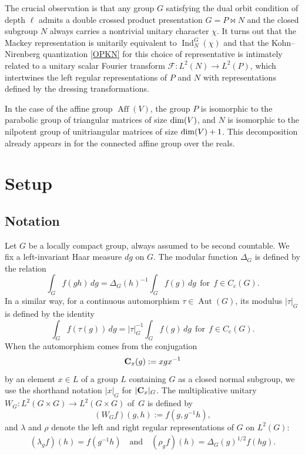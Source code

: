 \documentclass[a4paper,11pt,reqno]{amsart}
\numberwithin{equation}{section}
\theoremstyle{remark}
\theoremstyle{definition}
\newcommand\Aff{\operatorname{Aff}}
\newcommand\Aut{\operatorname{Aut}}
\newcommand{\CF}{\mathcal F}
\newcommand{\Ind}{\operatorname{Ind}}
\begin{document}
The crucial observation is that
any group $G$ satisfying the dual orbit condition of depth $\ell$ admits a double crossed product presentation $G=P\bowtie N$ and
 the closed subgroup $N$ always carries a nontrivial unitary character $\chi$. It turns out  that the Mackey representation is unitarily equivalent to
 ${\Ind}_{N}^G(\chi)$ and that the Kohn--Nirenberg quantization \eqref{OPKN} for this choice of representative is intimately related to a unitary
 scalar Fourier transform $\CF:L^2(N)\to L^2(P)$, which intertwines the left regular representations  of $P$ and $N$ with representations defined  by the dressing transformations.

In the case of the affine group $\Aff(V)$, the group $P$ is isomorphic to the parabolic group of  triangular matrices of size ${\rm dim}(V)$, and $N$
is isomorphic to the nilpotent group of  unitriangular matrices of size ${\rm dim}(V)+1$. This decomposition already appears in \cite{Medina}
for the connected affine group over the reals.


\section{Setup}

\subsection{Notation}
Let $G$ be a locally compact group, always assumed to be second countable. We fix a left-invariant Haar measure $dg$ on $G$.
The modular function $\Delta_G$ is defined by the relation
$$
\int_G f(gh)\,dg=\Delta_G(h)^{-1}\int_G f(g)\,dg\ \ \text{for}\ \ f\in C_c(G).
$$
In a similar way, for a continuous automorphism $\tau\in\Aut(G)$, its modulus $|\tau|_G$  is defined by the identity
$$
\int_Gf(\tau(g))\,dg=|\tau|_G^{-1}\int_Gf(g)\,dg\ \ \text{for}\ \ f\in C_c(G).
$$
When the automorphism comes from the conjugation $${\bf C}_x(g):=xgx^{-1}$$ by an element $x\in L$ of a group $L$
containing $G$ as a closed normal subgroup,  we use the shorthand notation $|x|_G$ for $|{\bf C}_x|_G$.
The multiplicative unitary $W_G\colon L^2(G\times G)\to L^2(G\times G)$ of~$G$ is defined by
$$
(W_Gf)(g,h):=f(g,g^{-1}h),
$$
and $\lambda$ and $\rho$  denote the left and right regular  representations of $G$ on $L^2(G)$:
\begin{align*}
(\lambda_gf)(h)=f(g^{-1}h)\quad\mbox{and}\quad(\rho_gf)(h)=\Delta_G(g)^{1/2}f(hg).
\end{align*}
\end{document}
